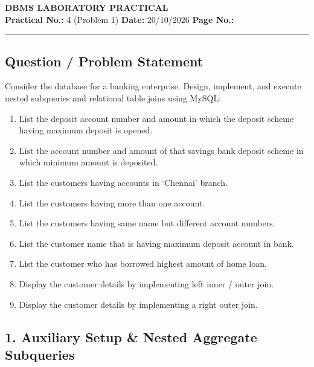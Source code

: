 \label{exp:subqueries}
\label{exp:subqueries_joins}
\label{exp:subqueries_prob1}
\noindent
\begin{center}
    {\LARGE \textbf{DBMS LABORATORY PRACTICAL}}\\[0.25cm]
    \textbf{Practical No.:} 4 (Problem 1) \hfill \textbf{Date:} 20/10/2026 \hfill \textbf{Page No.:} \thepage
\end{center}
\vspace{-0.2cm}
\hrule
\vspace{0.35cm}

\subsection*{Question / Problem Statement}
Consider the database for a banking enterprise. Design, implement, and execute nested subqueries and relational table joins using MySQL:
\begin{enumerate}[noitemsep,topsep=2pt]
    \item[(i)] List the deposit account number and amount in which the deposit scheme having maximum deposit is opened.
    \item[(ii)] List the account number and amount of that savings bank deposit scheme in which minimum amount is deposited.
    \item[(iii)] List the customers having accounts in `Chennai' branch.
    \item[(iv)] List the customers having more than one account.
    \item[(v)] List the customers having same name but different account numbers.
    \item[(vi)] List the customer name that is having maximum deposit account in bank.
    \item[(vii)] List the customer who has borrowed highest amount of home loan.
    \item[(viii)] Display the customer details by implementing left inner / outer join.
    \item[(ix)] Display the customer details by implementing a right outer join.
\end{enumerate}

\subsection*{1. Auxiliary Setup \& Nested Aggregate Subqueries}

